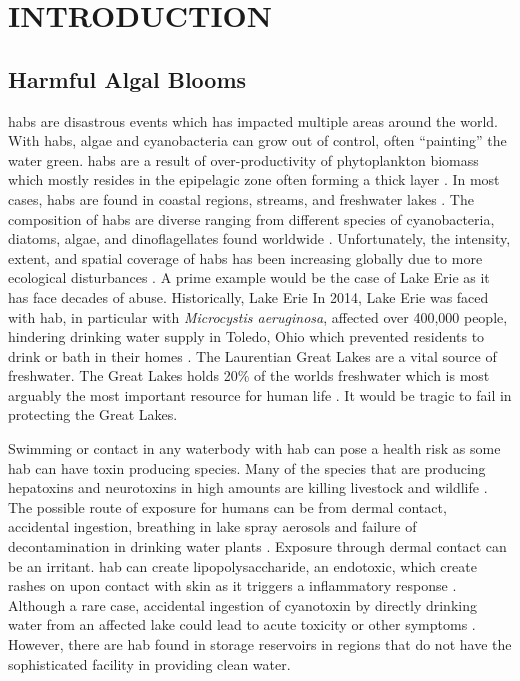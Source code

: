 
\chapter{INTRODUCTION}


\section{Harmful Algal Blooms}




\gls{habs} are disastrous events which has impacted multiple areas around the world. With \gls{habs}, algae and cyanobacteria can grow out of control, often ``painting'' the water green. \gls{habs} are a result of over-productivity of phytoplankton biomass which mostly resides in the epipelagic zone often forming a thick layer \cite{moore_richard_cyanobacterial_1993}.  In most cases, \gls{habs} are found in coastal regions, streams, and freshwater lakes \cite{rastogi_cyanotoxin-microcystins:_2014}. The composition of
\gls{habs} are diverse ranging from  different species of cyanobacteria, diatoms, algae, and dinoflagellates found worldwide \cite{dittmann_cyanobacterial_2012}.  Unfortunately, the intensity, extent, and spatial coverage of \gls{habs} has been increasing globally due to more ecological disturbances \cite{codd_cyanobacterial_1999}. A prime example would be the case of Lake Erie as it has face decades of abuse. Historically, Lake Erie  In 2014, Lake Erie was faced with \gls{hab}, in particular with \emph{Microcystis aeruginosa}, affected over 400,000 people, hindering drinking water supply in Toledo, Ohio which prevented residents to drink or bath in their homes \cite{mann_toledo_2014}.
The Laurentian Great Lakes are a vital source of freshwater. The Great Lakes holds 20\% of the worlds freshwater which is most arguably the most important resource for human life \cite{carmichael_health_2016}. It would be tragic to fail in protecting the Great Lakes.



Swimming or contact in any waterbody with \gls{hab} can pose a health risk as some \gls{hab} can have toxin producing species. Many of the species that are producing hepatoxins and neurotoxins in high amounts are killing livestock and wildlife \cite{anderson_harmful_2002}. The possible route of exposure  for humans can be from dermal contact, accidental ingestion, breathing in lake spray aerosols and failure of decontamination in drinking water plants \cite{may_aerosol_2018,codd_cyanobacterial_1999}. Exposure through dermal contact can be an irritant. \gls{hab} can create lipopolysaccharide, an endotoxic, which create rashes on upon contact with skin as it triggers a inflammatory response \cite{ moore_richard_cyanobacterial_1993}. Although a rare case, accidental ingestion of cyanotoxin by directly drinking water from an affected lake could  lead to acute toxicity or other symptoms \cite{monks_potent_2007}. However, there are \gls{hab} found in storage reservoirs in regions that do not have the sophisticated facility in providing clean water.

